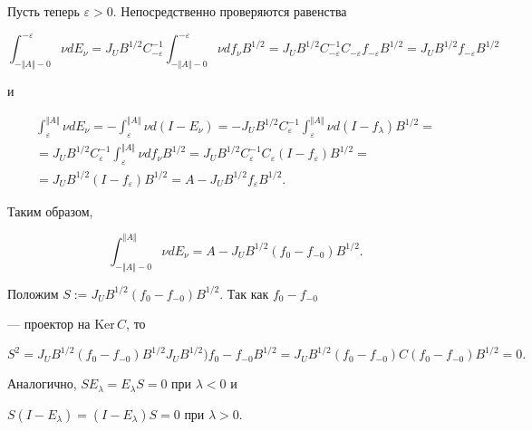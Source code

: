 \begin{pf}
Пусть теперь $\varepsilon >0$. Непосредственно проверяются равенства


$$


\int^{-\varepsilon}_{-\Vert A\Vert -0}\nu dE_{\nu}=J_{U}B^{1/2}C_{-\varepsilon}


^{-1}\int_{-\Vert A\Vert -0}^{-\varepsilon}\nu df_{\nu}B^{1/2}=


J_{U}B^{1/2}C_{-\varepsilon}^{-1}C_{-\varepsilon}f_{-\varepsilon}B^{1/2}=


J_{U}B^{1/2}f_{-\varepsilon}B^{1/2}


$$


и


\begin{multline*}


\int_{\varepsilon}^{\Vert A\Vert}\nu


dE_{\nu}=-\int_{\varepsilon}^{\Vert A\Vert}


\nu d(I-E_{\nu})=-J_{U}B^{1/2}C^{-1}_{\varepsilon}\int_{\varepsilon}


^{\Vert A\Vert}\nu d(I-f_{\lambda})B^{1/2}=\\


%


=J_{U}B^{1/2}C_{\varepsilon}^{-1}\int_{\varepsilon}^{\Vert A\Vert}\nu


df_{\nu}B^{1/2}= J_{U}B^{1/2}C_{\varepsilon}^{-1}C_{\varepsilon}


(I-f_{\varepsilon})B^{1/2}= \\


%


=J_{U}B^{1/2}(I-f_{\varepsilon})B^{1/2}=A-J_{U}B^{1/2}f_{\varepsilon}B^{1/2}.


\end{multline*}


Таким образом,


$$


\int_{-\Vert A\Vert -0}^{\Vert A\Vert}\nu dE_{\nu}=


A-J_{U}B^{1/2}(f_{0}-f_{-0})B^{1/2}.


$$


Положим $S:=J_{U}B^{1/2}(f_{0}-f_{-0})B^{1/2}$. Так как $f_{0}-f_{-0}$


--- проектор на $\text{Ker}\, C$, то


$$


S^{2}=J_{U}B^{1/2}(f_{0}-f_{-0})B^{1/2}J_{U}B^{1/2})f_{0}-f_{-0}B^{1/2}=


J_{U}B^{1/2}(f_{0}-f_{-0})C(f_{0}-f_{-0})B^{1/2}=0.


$$


Аналогично, $SE_{\lambda}=E_{\lambda}S=0$ при $\lambda <0$ и


$S(I-E_{\lambda})=(I-E_{\lambda})S=0$ при $\lambda >0$.


\end{pf}






